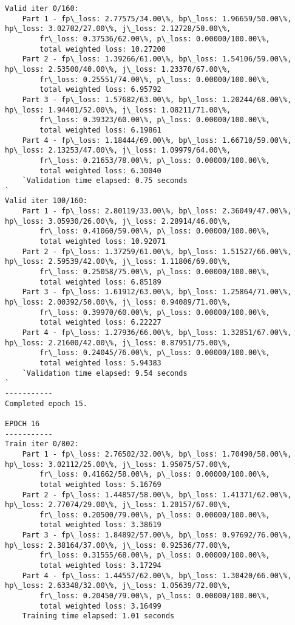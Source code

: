 \documentclass[11pt]{article}
\begin{document}
\begin{Verbatim}[commandchars=\\\{\}]
Valid iter 0/160:
	Part 1 - fp\_loss: 2.77575/34.00\%, bp\_loss: 1.96659/50.00\%, hp\_loss: 3.02702/27.00\%, j\_loss: 2.12728/50.00\%, 
		fr\_loss: 0.37536/62.00\%, p\_loss: 0.00000/100.00\%, 
		total weighted loss: 10.27200
	Part 2 - fp\_loss: 1.39266/61.00\%, bp\_loss: 1.54106/59.00\%, hp\_loss: 2.53500/40.00\%, j\_loss: 1.23370/67.00\%, 
		fr\_loss: 0.25551/74.00\%, p\_loss: 0.00000/100.00\%, 
		total weighted loss: 6.95792
	Part 3 - fp\_loss: 1.57682/63.00\%, bp\_loss: 1.20244/68.00\%, hp\_loss: 1.94401/52.00\%, j\_loss: 1.08211/71.00\%, 
		fr\_loss: 0.39323/60.00\%, p\_loss: 0.00000/100.00\%, 
		total weighted loss: 6.19861
	Part 4 - fp\_loss: 1.18444/69.00\%, bp\_loss: 1.66710/59.00\%, hp\_loss: 2.13253/47.00\%, j\_loss: 1.09979/64.00\%, 
		fr\_loss: 0.21653/78.00\%, p\_loss: 0.00000/100.00\%, 
		total weighted loss: 6.30040
	`Validation time elapsed: 0.75 seconds
`
Valid iter 100/160:
	Part 1 - fp\_loss: 2.80119/33.00\%, bp\_loss: 2.36049/47.00\%, hp\_loss: 3.05930/26.00\%, j\_loss: 2.28914/46.00\%, 
		fr\_loss: 0.41060/59.00\%, p\_loss: 0.00000/100.00\%, 
		total weighted loss: 10.92071
	Part 2 - fp\_loss: 1.37259/61.00\%, bp\_loss: 1.51527/66.00\%, hp\_loss: 2.59539/42.00\%, j\_loss: 1.11806/69.00\%, 
		fr\_loss: 0.25058/75.00\%, p\_loss: 0.00000/100.00\%, 
		total weighted loss: 6.85189
	Part 3 - fp\_loss: 1.61912/63.00\%, bp\_loss: 1.25864/71.00\%, hp\_loss: 2.00392/50.00\%, j\_loss: 0.94089/71.00\%, 
		fr\_loss: 0.39970/60.00\%, p\_loss: 0.00000/100.00\%, 
		total weighted loss: 6.22227
	Part 4 - fp\_loss: 1.27936/66.00\%, bp\_loss: 1.32851/67.00\%, hp\_loss: 2.21600/42.00\%, j\_loss: 0.87951/75.00\%, 
		fr\_loss: 0.24045/76.00\%, p\_loss: 0.00000/100.00\%, 
		total weighted loss: 5.94383
	`Validation time elapsed: 9.54 seconds
`
-----------
Completed epoch 15.

EPOCH 16
-----------
Train iter 0/802:
	Part 1 - fp\_loss: 2.76502/32.00\%, bp\_loss: 1.70490/58.00\%, hp\_loss: 3.02112/25.00\%, j\_loss: 1.95075/57.00\%, 
		fr\_loss: 0.41662/58.00\%, p\_loss: 0.00000/100.00\%, 
		total weighted loss: 5.16769
	Part 2 - fp\_loss: 1.44857/58.00\%, bp\_loss: 1.41371/62.00\%, hp\_loss: 2.77074/29.00\%, j\_loss: 1.20157/67.00\%, 
		fr\_loss: 0.20500/79.00\%, p\_loss: 0.00000/100.00\%, 
		total weighted loss: 3.38619
	Part 3 - fp\_loss: 1.84892/57.00\%, bp\_loss: 0.97692/76.00\%, hp\_loss: 2.38164/37.00\%, j\_loss: 0.92536/77.00\%, 
		fr\_loss: 0.31555/68.00\%, p\_loss: 0.00000/100.00\%, 
		total weighted loss: 3.17294
	Part 4 - fp\_loss: 1.44557/62.00\%, bp\_loss: 1.30420/66.00\%, hp\_loss: 2.63348/32.00\%, j\_loss: 1.05639/72.00\%, 
		fr\_loss: 0.20450/79.00\%, p\_loss: 0.00000/100.00\%, 
		total weighted loss: 3.16499
	Training time elapsed: 1.01 seconds


\end{Verbatim}
\end{document}
